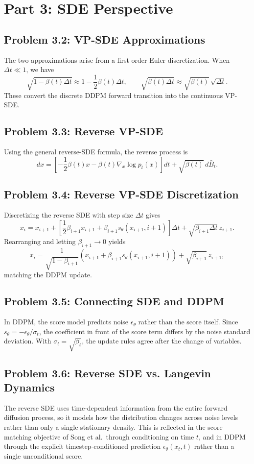 \documentclass[11pt]{article}
\begin{document}
\section{Part 3: SDE Perspective}

\subsection*{Problem 3.2: VP-SDE Approximations}
The two approximations arise from a first-order Euler discretization. When $\Delta t\ll 1$, we have
\[
\sqrt{1-\beta(t)\Delta t}\approx 1-\frac{1}{2}\beta(t)\Delta t,
\qquad
\sqrt{\beta(t)\Delta t}\approx \sqrt{\beta(t)}\,\sqrt{\Delta t}.
\]
These convert the discrete DDPM forward transition into the continuous VP-SDE.

\subsection*{Problem 3.3: Reverse VP-SDE}
Using the general reverse-SDE formula, the reverse process is
\[
dx = \left[-\frac{1}{2}\beta(t)x - \beta(t)\nabla_x\log p_t(x)\right]dt + \sqrt{\beta(t)}\,d\bar B_t.
\]

\subsection*{Problem 3.4: Reverse VP-SDE Discretization}
Discretizing the reverse SDE with step size $\Delta t$ gives
\[
x_i = x_{i+1} + \left[\frac{1}{2}\beta_{i+1}x_{i+1} + \beta_{i+1}s_\theta(x_{i+1},i+1)\right]\Delta t + \sqrt{\beta_{i+1}\Delta t}\,z_{i+1}.
\]
Rearranging and letting $\beta_{i+1}\to 0$ yields
\[
x_i=\frac{1}{\sqrt{1-\beta_{i+1}}}\left(x_{i+1}+\beta_{i+1}s_\theta(x_{i+1},i+1)\right)+\sqrt{\beta_{i+1}}\,z_{i+1},
\]
matching the DDPM update.

\subsection*{Problem 3.5: Connecting SDE and DDPM}
In DDPM, the score model predicts noise $\epsilon_\theta$ rather than the score itself. Since $s_\theta = -\epsilon_\theta/\sigma_t$, the coefficient in front of the score term differs by the noise standard deviation. With $\sigma_t=\sqrt{\beta_t}$, the update rules agree after the change of variables.

\subsection*{Problem 3.6: Reverse SDE vs. Langevin Dynamics}
The reverse SDE uses time-dependent information from the entire forward diffusion process, so it models how the distribution changes across noise levels rather than only a single stationary density. This is reflected in the score matching objective of Song et al.\ through conditioning on time $t$, and in DDPM through the explicit timestep-conditioned prediction $\epsilon_\theta(x_t,t)$ rather than a single unconditional score.
\end{document}
